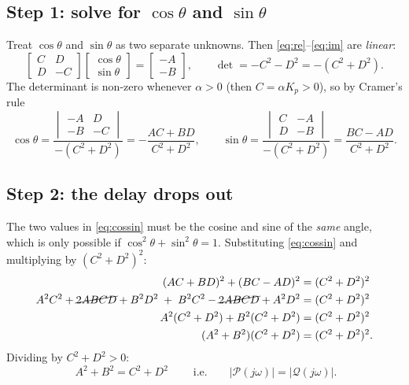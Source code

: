 \documentclass[11pt,a4paper]{article}
\theoremstyle{definition}
\begin{document}
\subsection{Step 1: solve for \texorpdfstring{$\cos\theta$}{cos theta} and \texorpdfstring{$\sin\theta$}{sin theta}}
Treat $\cos\theta$ and $\sin\theta$ as two separate unknowns. Then
\eqref{eq:re}--\eqref{eq:im} are \emph{linear}:
\[
\begin{bmatrix} C & D \\ D & -C \end{bmatrix}
\begin{bmatrix} \cos\theta \\ \sin\theta \end{bmatrix}
=
\begin{bmatrix} -A \\ -B \end{bmatrix},
\qquad \det = -C^2 - D^2 = -(C^2 + D^2) .
\]
The determinant is non-zero whenever $\alpha > 0$ (then $C = \alpha K_p > 0$),
so by Cramer's rule
\begin{equation}
\cos\theta = \frac{\begin{vmatrix} -A & D\\ -B & -C\end{vmatrix}}{-(C^2+D^2)}
           = -\frac{AC + BD}{C^{2}+D^{2}},
\qquad
\sin\theta = \frac{\begin{vmatrix} C & -A\\ D & -B\end{vmatrix}}{-(C^2+D^2)}
           = \frac{BC - AD}{C^{2}+D^{2}}.
\label{eq:cossin}
\end{equation}

\subsection{Step 2: the delay drops out}
The two values in \eqref{eq:cossin} must be the cosine and sine of the
\emph{same} angle, which is only possible if
$\cos^2\theta + \sin^2\theta = 1$. Substituting \eqref{eq:cossin} and
multiplying by $(C^2+D^2)^2$:
\begin{align*}
(AC + BD)^2 + (BC - AD)^2 &= (C^2 + D^2)^2\\
A^2C^2 + \cancel{2ABCD} + B^2D^2 \;+\; B^2C^2 - \cancel{2ABCD} + A^2D^2
&= (C^2+D^2)^2\\
A^2(C^2 + D^2) + B^2(C^2 + D^2) &= (C^2+D^2)^2\\
(A^2 + B^2)(C^2 + D^2) &= (C^2+D^2)^2 .
\end{align*}
Dividing by $C^2 + D^2 > 0$:
\begin{equation}
\boxed{\;A^{2} + B^{2} = C^{2} + D^{2}\;}
\qquad\text{i.e.}\qquad
|\mathcal{P}(j\omega)| = |\mathcal{Q}(j\omega)| .
\label{eq:mag}
\end{equation}
\end{document}
